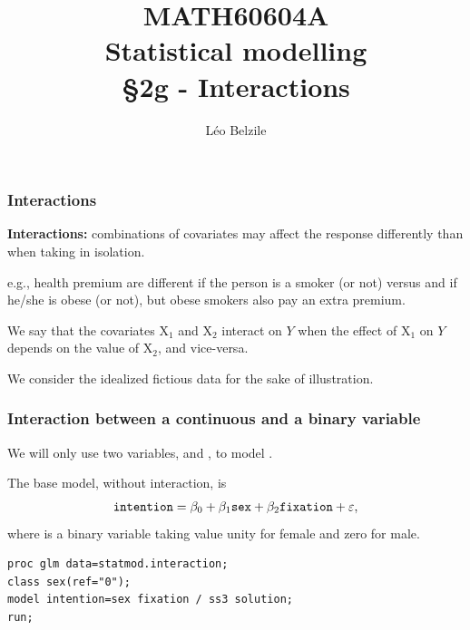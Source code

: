 \documentclass{beamer}
\title[\color{white}{MATH60604A Interactions}]{\texorpdfstring{MATH60604A \\Statistical modelling \\ \S 2g - Interactions}{MATH60604A \\Statistical modelling \\ \S~2g - Interactions}}
\author{Léo Belzile}
\institute{HEC Montréal\\
Department of Decision Sciences}
\date{}
\begin{document}
\frame{\titlepage}

\begin{frame}
 \frametitle{Interactions}
 \bi 
 \item \textbf{Interactions:} combinations of covariates may affect the response differently than  when taking in isolation.
 \item e.g., health premium are different if the person is a smoker (or not) versus and if he/she is obese (or not), but obese smokers also pay an extra premium.
\item We say that the covariates $\mathrm{X}_1$ and $\mathrm{X}_2$ interact on $Y$ when \alert{the effect of $\mathrm{X}_1$ on $Y$ depends on the value of $\mathrm{X}_2$, and vice-versa}.
  \item We consider the idealized fictious data  for the sake of illustration.
  \ei
 \end{frame}
 
\begin{frame}[fragile]
\frametitle{Interaction between a continuous and a binary variable}
\bi
\item We will only use two variables,  and , to model . 
\item The base model, without interaction, is
\begin{align*}
\texttt{intention}=\beta_0 + \beta_1 \texttt{sex} + \beta_2 \texttt{fixation} + \varepsilon,
\end{align*}
where  is a binary variable taking value unity for female and zero for male.
\ei
\begin{tcolorbox}[colback=white,colframe=hecblue,title=\SASlang code to fit a linear model]
\begin{verbatim}
proc glm data=statmod.interaction;
class sex(ref="0");
model intention=sex fixation / ss3 solution;
run;
\end{verbatim}
\end{tcolorbox}
\end{frame}
\end{document}
